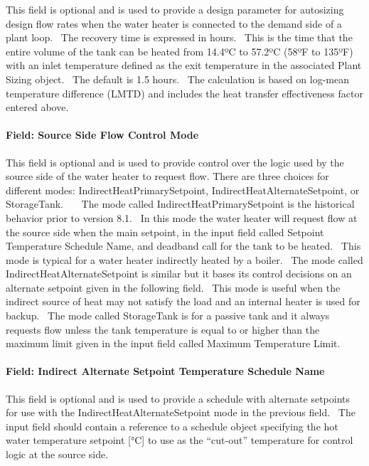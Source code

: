 This field is optional and is used to provide a design parameter for autosizing design flow rates when the water heater is connected to the demand side of a plant loop.~ The recovery time is expressed in hours.~ This is the time that the entire volume of the tank can be heated from 14.4ºC to 57.2ºC (58ºF to 135ºF) with an inlet temperature defined as the exit temperature in the associated Plant Sizing object.~ The default is 1.5 hours.~ The calculation is based on log-mean temperature difference (LMTD) and includes the heat transfer effectiveness factor entered above.

\paragraph{Field: Source Side Flow Control Mode}\label{field-source-side-flow-control-mode}

This field is optional and is used to provide control over the logic used by the source side of the water heater to request flow. There are three choices for different modes: IndirectHeatPrimarySetpoint, IndirectHeatAlternateSetpoint, or StorageTank.~~~ The mode called IndirectHeatPrimarySetpoint is the historical behavior prior to version 8.1.~ In this mode the water heater will request flow at the source side when the main setpoint, in the input field called Setpoint Temperature Schedule Name, and deadband call for the tank to be heated.~ This mode is typical for a water heater indirectly heated by a boiler.~ The mode called IndirectHeatAlternateSetpoint is similar but it bases its control decisions on an alternate setpoint given in the following field.~ This mode is useful when the indirect source of heat may not satisfy the load and an internal heater is used for backup.~ The mode called StorageTank is for a passive tank and it always requests flow unless the tank temperature is equal to or higher than the maximum limit given in the input field called Maximum Temperature Limit.

\paragraph{Field: Indirect Alternate Setpoint Temperature Schedule Name}\label{field-indirect-alternate-setpoint-temperature-schedule-name}

This field is optional and is used to provide a schedule with alternate setpoints for use with the IndirectHeatAlternateSetpoint mode in the previous field.~ The input field should contain a reference to a schedule object specifying the hot water temperature setpoint {[}°C{]} to use as the ``cut-out'' temperature for control logic at the source side.

